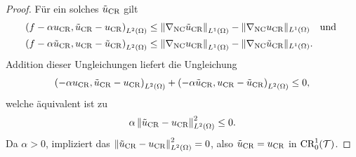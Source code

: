 \begin{proof}
  \medskip
  Für ein solches $\tilde{u}_{\textup{CR}}$ gilt
  \begin{align*}
    \left(f-\alpha u_\textup{CR},\tilde{u}_{\textup{CR}}-u_\textup{CR}\right)_{L^2(\Omega)} 
    &\leq
    \left\Vert\nabla_\textup{NC}\tilde{u}_{\textup{CR}}\right\Vert_{L^1(\Omega)}
    -\Vert\nabla_\textup{NC}u_\textup{CR}\Vert_{L^1(\Omega)}\quad\text{und }\\
    \left(f-\alpha\tilde{u}_{\textup{CR}},u_\textup{CR}-\tilde{u}_{\textup{CR}}\right)_{L^2(\Omega)} 
    &\leq
    \left\Vert\nabla_\textup{NC}u_\textup{CR}\right\Vert_{L^1(\Omega)}
    -\Vert\nabla_\textup{NC}\tilde{u}_{\textup{CR}}\Vert_{L^1(\Omega)}. 
  \end{align*}
  Addition dieser Ungleichungen
  liefert die Ungleichung
  \begin{align*}
    \left(-\alpha u_\textup{CR},\tilde{u}_{\textup{CR}}-u_\textup{CR}\right)_{L^2(\Omega)} 
    + \left(-\alpha\tilde{u}_{\textup{CR}},u_\textup{CR}-\tilde{u}_{\textup{CR}}\right)_{L^2(\Omega)} 
    \leq
    0,
  \end{align*}
  welche äquivalent ist zu
  \begin{align*}
    \alpha\left\Vert\tilde{u}_{\textup{CR}}-u_\textup{CR}\right\Vert_{L^2(\Omega)}^2
    \leq
    0.
  \end{align*}
  Da $\alpha>0$, impliziert das
  $\left\Vert\tilde{u}_{\textup{CR}}-u_\textup{CR}\right\Vert_{L^2(\Omega)}^2=0$, also
  $\tilde{u}_{\textup{CR}}=u_\textup{CR}$ in $\textup{CR}^1_0(\mathcal{T})$.
\end{proof}

